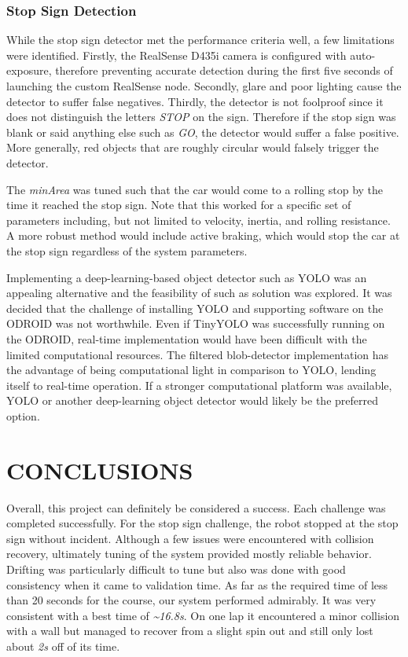 \documentclass[letterpaper, 10 pt, conference]{ieeeconf}  %
\begin{document}
\subsubsection{Stop Sign Detection}
While the stop sign detector met the performance criteria well, a few limitations were identified. Firstly, the RealSense D435i camera is configured with auto-exposure, therefore preventing accurate detection during the first five seconds of launching the custom RealSense node. Secondly, glare and poor lighting cause the detector to suffer false negatives. Thirdly, the detector is not foolproof since it does not distinguish the letters \textit{STOP} on the sign. Therefore if the stop sign was blank or said anything else such as \textit{GO}, the detector would suffer a false positive. More generally, red objects that are roughly circular would falsely trigger the detector.

The \textit{minArea} was tuned such that the car would come to a rolling stop by the time it reached the stop sign. Note that this worked for a specific set of parameters including, but not limited to velocity, inertia, and rolling resistance. A more robust method would include active braking, which would stop the car at the stop sign regardless of the system parameters.

Implementing a deep-learning-based object detector such as YOLO was an appealing alternative and the feasibility of such as solution was explored. It was decided that the challenge of installing YOLO and supporting software on the ODROID was not worthwhile. Even if TinyYOLO was successfully running on the ODROID, real-time implementation would have been difficult with the limited computational resources. The filtered blob-detector implementation has the advantage of being computational light in comparison to YOLO, lending itself to real-time operation. If a stronger computational platform was available, YOLO or another deep-learning object detector would likely be the preferred option.

\section{CONCLUSIONS}
Overall, this project can definitely be considered a success. Each challenge was completed successfully. For the stop sign challenge, the robot stopped at the stop sign without incident. Although a few issues were encountered with collision recovery, ultimately tuning of the system provided mostly reliable behavior. Drifting was particularly difficult to tune but also was done with good consistency when it came to validation time. As far as the required time of less than 20 seconds for the course, our system performed admirably. It was very consistent with a best time of \textit{\textasciitilde16.8s}. On one lap it encountered a minor collision with a wall but managed to recover from a slight spin out and still only lost about \textit{2s} off of its time.
\end{document}
